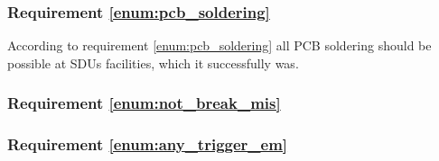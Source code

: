\subsubsection{Requirement \ref{enum:pcb_soldering}} %
\label{ssub:requirement_enum:pcb_soldering}
According to requirement \ref{enum:pcb_soldering} all PCB soldering should be possible at SDUs facilities, which it successfully was.


\subsubsection{Requirement \ref{enum:not_break_mis}} %
\label{ssub:requirement_enum:not_break_mis}

\subsubsection{Requirement \ref{enum:any_trigger_em}} %
\label{ssub:requirement_enum:any_trigger_em}
